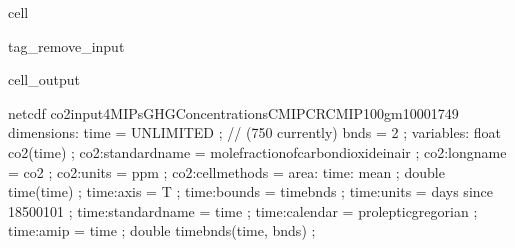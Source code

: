 \documentclass[letterpaper,10pt,english]{jupyterBook}
\begin{document}
\begin{sphinxuseclass}{cell}
\begin{sphinxuseclass}{tag_remove_input}\begin{sphinxVerbatimOutput}

\begin{sphinxuseclass}{cell_output}
\begin{sphinxVerbatim}[commandchars=\\\{\}]
netcdf co2\PYGZus{}input4MIPs\PYGZus{}GHGConcentrations\PYGZus{}CMIP\PYGZus{}CR\PYGZhy{}CMIP\PYGZhy{}1\PYGZhy{}0\PYGZhy{}0\PYGZus{}gm\PYGZus{}1000\PYGZhy{}1749 \PYGZob{}
dimensions:
	time = UNLIMITED ; // (750 currently)
	bnds = 2 ;
variables:
	float co2(time) ;
		co2:standard\PYGZus{}name = \PYGZdq{}mole\PYGZus{}fraction\PYGZus{}of\PYGZus{}carbon\PYGZus{}dioxide\PYGZus{}in\PYGZus{}air\PYGZdq{} ;
		co2:long\PYGZus{}name = \PYGZdq{}co2\PYGZdq{} ;
		co2:units = \PYGZdq{}ppm\PYGZdq{} ;
		co2:cell\PYGZus{}methods = \PYGZdq{}area: time: mean\PYGZdq{} ;
	double time(time) ;
		time:axis = \PYGZdq{}T\PYGZdq{} ;
		time:bounds = \PYGZdq{}time\PYGZus{}bnds\PYGZdq{} ;
		time:units = \PYGZdq{}days since 1850\PYGZhy{}01\PYGZhy{}01\PYGZdq{} ;
		time:standard\PYGZus{}name = \PYGZdq{}time\PYGZdq{} ;
		time:calendar = \PYGZdq{}proleptic\PYGZus{}gregorian\PYGZdq{} ;
		time:amip = \PYGZdq{}time\PYGZdq{} ;
	double time\PYGZus{}bnds(time, bnds) ;


\end{sphinxVerbatim}
\end{sphinxuseclass}
\end{sphinxVerbatimOutput}
\end{sphinxuseclass}
\end{sphinxuseclass}
\end{document}
